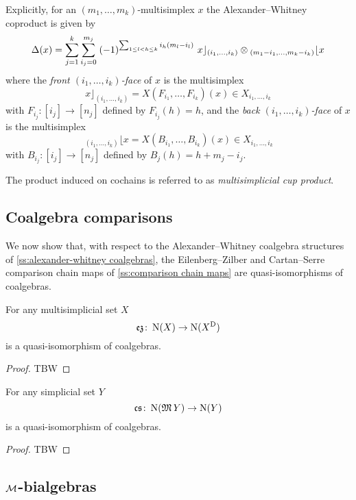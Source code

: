 Explicitly, for an $(m_1, \dots, m_k)$-multisimplex $x$ the Alexander--Whitney coproduct is given by
\[
\operatorname{\Delta}(x) =
\sum_{j=1}^k \sum_{i_{j}=0}^{m_{j}} \;  
(-1)^{\sum_{1 \leq l<h \leq k} i_h (m_l-i_l) } \
x \rfloor_{(i_{1},\dots,i_{k})} \otimes 
\!\,_{(m_{1}-i_{1}, \dots, m_{k}-i_{k})} \lfloor x
\]
where the \textit{front $(i_1, \dots, i_k)$-face} of $x$ is the multisimplex
\[
x \rfloor_{(i_{1}, \dots, i_{k})} =
X(F_{i_1}, \dots, F_{i_k})(x) \in X_{i_1, \dots, i_k}
\]
with
$F_{i_j} \colon [i_j] \to [n_j]$ defined by $F_{i_j}(h)=h$, and the \textit{back $(i_1, \dots, i_k)$-face} of $x$ is the multisimplex
\[
\,_{(i_{1}, \dots, i_{k})} \lfloor x =
X(B_{i_1}, \dots, B_{i_k})(x) \in X_{i_1, \dots, i_k}
\]
with $B_{i_j} \colon [i_j] \to [n_j]$ defined by $B_j(h) = h+m_j-i_j$.

The product induced on cochains is referred to as \textit{multisimplicial cup product}.

\subsection{Coalgebra comparisons}

We now show that, with respect to the Alexander--Whitney coalgebra structures of \cref{ss:alexander-whitney coalgebras}, the Eilenberg--Zilber and Cartan--Serre comparison chain maps of \cref{ss:comparison chain maps} are quasi-isomorphisms of coalgebras.

\begin{theorem}
	For any multisimplicial set $X$
	\[
	\operatorname{\mathfrak{ez}} \colon \operatorname{N}(X) \to \operatorname{N}(X^{\mathrm{D}})
	\]
	is a quasi-isomorphism of coalgebras.
\end{theorem}

\begin{proof}
	TBW 
\end{proof}

\begin{theorem}
	For any simplicial set $Y$
	\[
	\operatorname{\mathfrak{cs}} \colon \operatorname{N}(\operatorname{\mathfrak{M}} Y) \to \operatorname{N}(Y)
	\]
	is a quasi-isomorphism of coalgebras.
\end{theorem}

\begin{proof}
	TBW 
\end{proof}

\subsection{$\mathcal{M}$-bialgebras}

